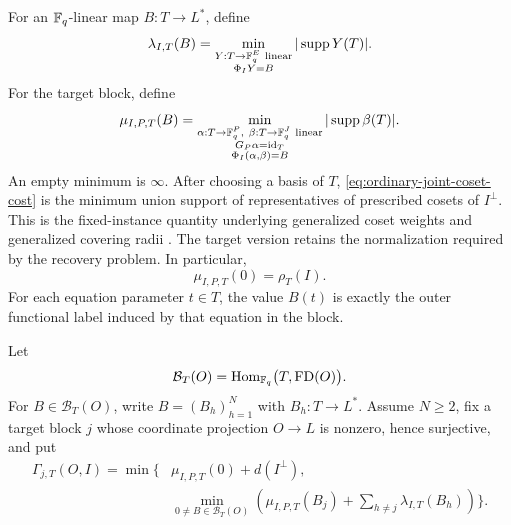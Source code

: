 For an $\mathbb F_q$-linear map $B:T\to L^*$, define
\begin{equation}
 \lambda_{I,T}(B)=
 \min_{\substack{Y:T\to\mathbb F_q^E\ \mathrm{linear}\\
                  \Phi_IY=B}}
 |\operatorname{supp} Y(T)|.
 \label{eq:ordinary-joint-coset-cost}
\end{equation}
For the target block, define
\begin{equation}
 \mu_{I,P,T}(B)=
 \min_{\substack{\alpha:T\to\mathbb F_q^P,\ \beta:T\to\mathbb F_q^J\ \mathrm{linear}\\
                  G_P\alpha=\operatorname{id}_T\\
                  \Phi_I(\alpha,\beta)=B}}
 |\operatorname{supp}\beta(T)|.
 \label{eq:target-joint-coset-cost}
\end{equation}
An empty minimum is $\infty$.  After choosing a basis of $T$,
\eqref{eq:ordinary-joint-coset-cost} is the minimum union support of
representatives of prescribed cosets of $I^\perp$.  This is the fixed-instance
quantity underlying generalized coset weights and generalized covering radii
\cite{ZhangEtAl2019,ElimelechFirerSchwartz2021}.  The target version retains
the normalization required by the recovery problem.  In particular,
\begin{equation}
 \mu_{I,P,T}(0)=\rho_T(I).
 \label{eq:zero-target-joint-coset-cost}
\end{equation}
For each equation parameter $t\in T$, the value $B(t)$ is exactly the outer
functional label induced by that equation in the block.

Let
\[
 \mathcal B_T(O)=
 \operatorname{Hom}_{\mathbb F_q}\bigl(T,\operatorname{FD}(O)\bigr).
\]
For $B\in\mathcal B_T(O)$, write $B=(B_h)_{h=1}^N$ with
$B_h:T\to L^*$.  Assume $N\geq2$, fix a target block $j$ whose coordinate projection
$O\to L$ is nonzero, hence surjective, and put
\begin{equation}
 \begin{split}
 \Gamma_{j,T}(O,I)=\min\Biggl\{&
 \mu_{I,P,T}(0)+d(I^\perp),\\
 &\min_{0\ne B\in\mathcal B_T(O)}
 \left(
 \mu_{I,P,T}(B_j)+
 \sum_{h\ne j}\lambda_{I,T}(B_h)
 \right)
 \Biggr\}.
 \end{split}
 \label{eq:weighted-subspace-cost}
\end{equation}

